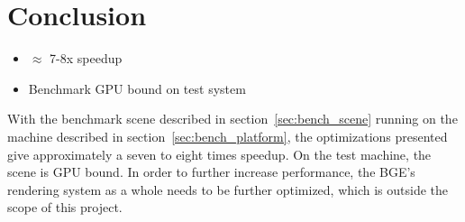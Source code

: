 \section{Conclusion}
\ifsummaries
\begin{itemize}
 \item $\approx$ 7-8x speedup
 \item Benchmark GPU bound on test system
\end{itemize}
\fi

With the benchmark scene described in section~\ref{sec:bench_scene} running on the machine described in section~\ref{sec:bench_platform}, the optimizations presented give approximately a seven to eight times speedup. On the test machine, the scene is GPU bound. In order to further increase performance, the BGE's rendering system as a whole needs to be further optimized, which is outside the scope of this project.

